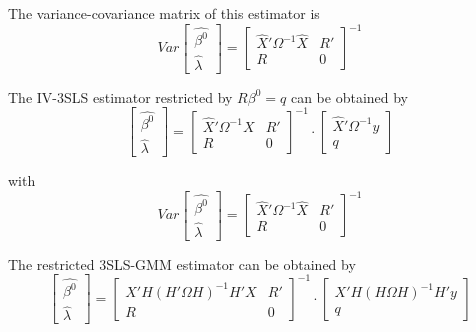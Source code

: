 \documentclass[article]{jss}
\begin{document}
The variance-covariance matrix of this estimator is
\begin{equation}
   Var 
   \left[ \begin{array}{c}
      \widehat{\beta^0} \\ \widehat{\lambda}
   \end{array} \right] 
   = 
   \left[ \begin{array}{cc}
      \widehat{X}' \Omega^{-1} \widehat{X} & R' \\ 
      R & 0
   \end{array} \right]^{-1}
   \label{eq:cov3slsr}
\end{equation}


The IV-3SLS estimator restricted by $R \beta^0 = q$ can be obtained by
\begin{equation}
   \left[ \begin{array}{c}
      \widehat{\beta^0} \\ \widehat{\lambda}
   \end{array} \right]
   =
   \left[ \begin{array}{cc}
      \widehat{X}' \Omega^{-1} X & R' \\ 
      R & 0
   \end{array} \right]^{-1}
   \cdot
   \left[ \begin{array}{c}
      \widehat{X}' \Omega^{-1} y \\ q 
   \end{array} \right]
\end{equation}

with
\begin{equation}
   Var 
   \left[ \begin{array}{c}
      \widehat{\beta^0} \\ \widehat{\lambda}
   \end{array} \right] 
   = 
   \left[ \begin{array}{cc}
      \widehat{X}' \Omega^{-1} \widehat{X} & R' \\ 
      R & 0
   \end{array} \right]^{-1}
\end{equation}


The restricted 3SLS-GMM estimator can be obtained by
\begin{equation}
   \left[ \begin{array}{c}
      \widehat{\beta^0} \\ \widehat{\lambda}
   \end{array} \right]
   =
   \left[ \begin{array}{cc}
      X' H \left( H' \Omega H \right)^{-1} H' X & R' \\ 
      R & 0
   \end{array} \right]^{-1}
   \cdot
   \left[ \begin{array}{c}
      X' H \left( H \Omega H \right)^{-1} H' y \\ q 
   \end{array} \right]
\end{equation}
\end{document}
